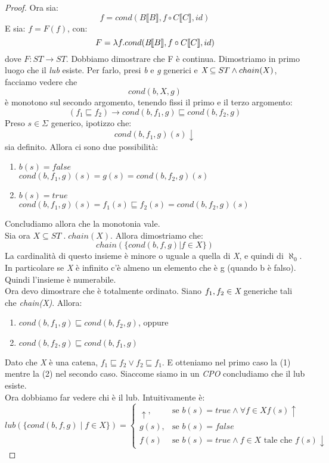 \documentclass[a4paper, 10pt]{article} %
\begin{document}
\begin{proof}
  Ora sia:
  $$ f = cond(B \llbracket B \rrbracket , f \circ C \llbracket C \rrbracket , id) $$
  E sia:
  $ f = F(f) $, con:
  $$ F = \lambda f . cond(\emph{B} \llbracket B \rrbracket , f \circ C \llbracket C \rrbracket , id) $$
  dove $ F: ST \rightarrow ST $. Dobbiamo dimostrare che F è continua. Dimostriamo in primo luogo che il \emph{lub} esiste. Per farlo, presi \emph{b} e \emph{g} generici e $ \emph{X} \subseteq ST \land chain(X) $, facciamo vedere che $$ cond(b,X,g) $$ è monotono sul secondo argomento, tenendo fissi il primo e il terzo argomento:
  $$ (f_1 \sqsubseteq f_2) \rightarrow cond(b,f_{1},g) \sqsubseteq cond(b,f_{2},g) $$
  Preso $s \in \Sigma $ generico, ipotizzo che:
  $$ cond(b,f_1,g)(s) \downarrow $$
  sia definito. Allora ci sono due possibilità:
  \begin{enumerate}
  \item $ b(s) = false $ \\
    $ cond(b,f_1,g)(s)=g(s)=cond(b,f_2,g)(s) $
  \item $ b(s) = true $ \\
    $ cond(b,f_1,g)(s) = f_{1}(s) \sqsubseteq f_{2}(s) = cond(b,f_2,g)(s) $
  \end{enumerate}
  Concludiamo allora che la monotonia vale. \\
  Sia ora $ X \subseteq ST \; . \; chain(X) $. Allora dimostriamo che:
  $$ chain( \{cond(b,f,g) | f \in X\}) $$
  La cardinalità di questo insieme è minore o uguale a quella di \emph{X}, e quindi di $ \aleph_0 $. In particolare se \emph{X} è infinito c'è almeno un elemento che è g (quando b è falso). Quindi l'insieme è numerabile. \\ Ora devo dimostrare che è totalmente ordinato. Siano $f_1,f_2 \in \emph{X}$ generiche tali che \emph{chain(X)}. Allora:
  \begin{enumerate}
  \item $cond(b,f_1,g) \sqsubseteq cond(b,f_2,g)$, oppure
  \item $cond(b,f_2,g) \sqsubseteq cond(b,f_1,g)$
  \end{enumerate}
  Dato che \emph{X} è una catena, $f_1 \sqsubseteq f_2 \lor f_2 \sqsubseteq f_1 $. E otteniamo nel primo caso la (1) mentre la (2) nel secondo caso. Siaccome siamo in un \emph{CPO} concludiamo che il lub esiste. \\
  Ora dobbiamo far vedere chi è il lub. Intuitivamente è:
  $$ lub( \{ cond(b,f,g) \; | \; f \in X \})= \begin{cases} \uparrow , & \mbox{se } b(s)=true \land \forall f \in X f(s) \uparrow \; \\ g(s), & \mbox{se } b(s)=false \; \\ f(s) & \mbox{se } b(s)=true \land f \in X \mbox{ tale che } f(s) \downarrow 

\end{cases}$$
\end{proof}
\end{document}
